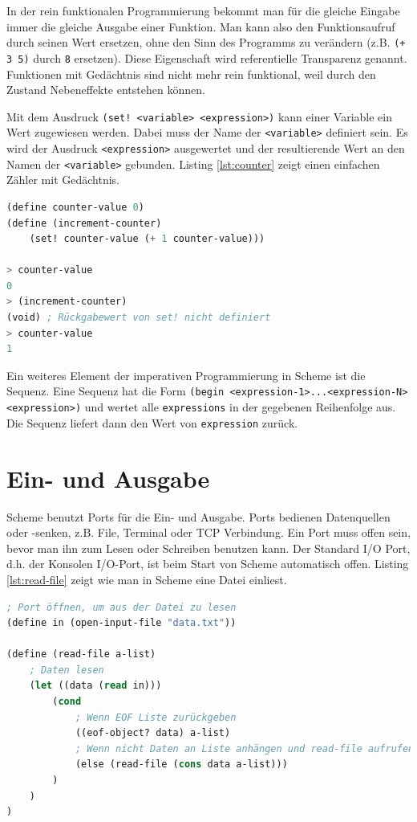 In der rein funktionalen Programmierung bekommt man für die gleiche Eingabe immer die gleiche Ausgabe einer Funktion. Man kann also den Funktionsaufruf durch seinen Wert ersetzen, ohne den Sinn des Programms zu verändern (z.B. \verb|(+ 3 5)| durch \verb|8| ersetzen). Diese Eigenschaft wird referentielle Transparenz genannt. Funktionen mit Gedächtnis sind nicht mehr rein funktional, weil durch den Zustand Nebeneffekte entstehen können. 

Mit dem Ausdruck \verb|(set! <variable> <expression>)| kann einer Variable ein Wert zugewiesen werden. Dabei muss der Name der \verb|<variable>| definiert sein. Es wird der Ausdruck \verb|<expression>| ausgewertet und der resultierende Wert an den Namen der \verb|<variable>| gebunden. Listing \ref{lst:counter} zeigt einen einfachen Zähler mit Gedächtnis.

\begin{lstlisting}[language=Lisp, caption=Zähler mit Gedächtnis, label=lst:counter]
(define counter-value 0)
(define (increment-counter)
	(set! counter-value (+ 1 counter-value)))
	
> counter-value
0
> (increment-counter)
(void) ; Rückgabewert von set! nicht definiert
> counter-value
1
\end{lstlisting}

Ein weiteres Element der imperativen Programmierung in Scheme ist die Sequenz. Eine Sequenz hat die Form \verb|(begin <expression-1>...<expression-N> <expression>)| und wertet alle \verb|expressions| in der gegebenen Reihenfolge aus. Die Sequenz liefert dann den Wert von \verb|expression| zurück.

\section{Ein- und Ausgabe}

Scheme benutzt Ports für die Ein- und Ausgabe. Ports bedienen Datenquellen oder -senken, z.B. File, Terminal oder TCP Verbindung. Ein Port muss offen sein, bevor man ihn zum Lesen oder Schreiben benutzen kann. Der Standard I/O Port, d.h. der Konsolen I/O-Port, ist beim Start von Scheme automatisch offen. Listing \ref{lst:read-file} zeigt wie man in Scheme eine Datei einliest. 

\begin{lstlisting}[language=Lisp, caption=Datei lesen, label=lst:read-file]
; Port öffnen, um aus der Datei zu lesen
(define in (open-input-file "data.txt"))

(define (read-file a-list)
	; Daten lesen
	(let ((data (read in)))
		(cond
			; Wenn EOF Liste zurückgeben
			((eof-object? data) a-list)
			; Wenn nicht Daten an Liste anhängen und read-file aufrufen
			(else (read-file (cons data a-list)))
		)
	)
)
\end{lstlisting}

